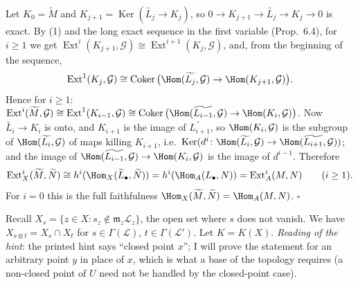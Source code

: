\documentclass[11pt]{article}
\begin{document}
Let $K_0=\widetilde M$ and $K_{j+1}=\operatorname{Ker}(\widetilde{L_j}\to K_j)$, so $0\to K_{j+1}\to\widetilde{L_j}\to K_j\to0$ is exact. By (1) and the long exact sequence in the first variable (Prop.~6.4), for $i\ge1$ we get $\operatorname{Ext}^i(K_{j+1},\mathcal G)\cong\operatorname{Ext}^{i+1}(K_j,\mathcal G)$, and, from the beginning of the sequence,
\[
\operatorname{Ext}^1(K_j,\mathcal G)\cong\operatorname{Coker}\big(\Hom(\widetilde{L_j},\mathcal G)\to\Hom(K_{j+1},\mathcal G)\big).
\]
Hence for $i\ge1$: $\operatorname{Ext}^i(\widetilde M,\mathcal G)\cong\operatorname{Ext}^1(K_{i-1},\mathcal G)\cong\operatorname{Coker}\big(\Hom(\widetilde{L_{i-1}},\mathcal G)\to\Hom(K_i,\mathcal G)\big)$. Now $\widetilde{L_i}\to K_i$ is onto, and $K_{i+1}$ is the image of $\widetilde{L_{i+1}}$, so $\Hom(K_i,\mathcal G)$ is the subgroup of $\Hom(\widetilde{L_i},\mathcal G)$ of maps killing $K_{i+1}$, i.e.\ $\operatorname{Ker}(d^i\colon\Hom(\widetilde{L_i},\mathcal G)\to\Hom(\widetilde{L_{i+1}},\mathcal G))$; and the image of $\Hom(\widetilde{L_{i-1}},\mathcal G)\to\Hom(K_i,\mathcal G)$ is the image of $d^{i-1}$. Therefore
\[
\operatorname{Ext}^i_X(\widetilde M,\widetilde N)\cong h^i(\Hom_X(\widetilde L_\bullet,\widetilde N))=h^i(\Hom_A(L_\bullet,N))=\operatorname{Ext}^i_A(M,N)\qquad(i\ge1).
\]
For $i=0$ this is the full faithfulness $\Hom_X(\widetilde M,\widetilde N)=\Hom_A(M,N)$. \hfill$\square$

\pf
Recall $X_s=\{z\in X: s_z\notin\mathfrak m_z\mathcal L_z\}$, the open set where $s$ does not vanish. We have $X_{s\otimes t}=X_s\cap X_t$ for $s\in\Gamma(\mathcal L)$, $t\in\Gamma(\mathcal L')$. Let $K=K(X)$. \emph{Reading of the hint}: the printed hint says ``closed point $x$''; I will prove the statement for an arbitrary point $y$ in place of $x$, which is what a base of the topology requires (a non-closed point of $U$ need not be handled by the closed-point case).
\end{document}
